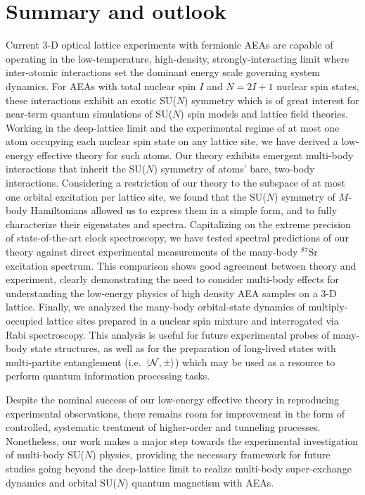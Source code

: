 \documentclass[preprint,showkeys,nofootinbib]{revtex4-1}
\newcommand{\N}{\mathcal{N}}
\newcommand{\1}{\mathds{1}}
\begin{document}
\section{Summary and outlook}
\label{sec:summary}

Current 3-D optical lattice experiments with fermionic AEAs are
capable of operating in the low-temperature, high-density,
strongly-interacting limit where inter-atomic interactions set the
dominant energy scale governing system dynamics.  For AEAs with total
nuclear spin $I$ and $N=2I+1$ nuclear spin states, these interactions
exhibit an exotic SU($N$) symmetry which is of great interest for
near-term quantum simulations of SU($N$) spin models and lattice field
theories.  Working in the deep-lattice limit and the experimental
regime of at most one atom occupying each nuclear spin state on any
lattice site, we have derived a low-energy effective theory for such
atoms.  Our theory exhibits emergent multi-body interactions that
inherit the SU($N$) symmetry of atoms' bare, two-body interactions.
Considering a restriction of our theory to the subspace of at most one
orbital excitation per lattice site, we found that the SU($N$)
symmetry of $M$-body Hamiltonians allowed us to express them in a
simple form, and to fully characterize their eigenstates and spectra.
Capitalizing on the extreme precision of state-of-the-art clock
spectroscopy, we have tested spectral predictions of our theory
against direct experimental measurements of the many-body ${}^{87}$Sr
excitation spectrum.  This comparison shows good agreement between
theory and experiment, clearly demonstrating the need to consider
multi-body effects for understanding the low-energy physics of high
density AEA samples on a 3-D lattice.  Finally, we analyzed the
many-body orbital-state dynamics of multiply-occupied lattice sites
prepared in a nuclear spin mixture and interrogated via Rabi
spectroscopy.  This analysis is useful for future experimental probes
of many-body state structures, as well as for the preparation of
long-lived states with multi-partite entanglement
(i.e.~$\ket{\N,\pm}$) which may be used as a resource to perform
quantum information processing tasks.

Despite the nominal success of our low-energy effective theory in
reproducing experimental observations, there remains room for
improvement in the form of controlled, systematic treatment of
higher-order and tunneling processes.  Nonetheless, our work makes a
major step towards the experimental investigation of multi-body
SU($N$) physics, providing the necessary framework for future studies
going beyond the deep-lattice limit to realize multi-body
super-exchange dynamics and orbital SU($N$) quantum magnetism with
AEAs.
\end{document}
